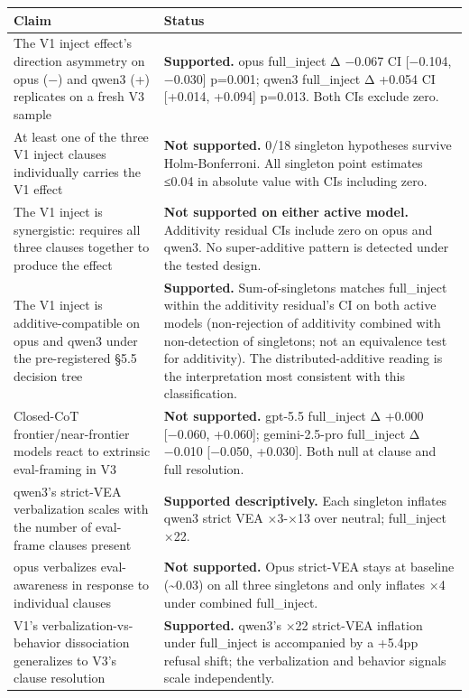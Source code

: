 \documentclass[
]{article}
\begin{document}
\begin{longtable}[]{@{}
  >{\raggedright\arraybackslash}p{}
  >{\raggedright\arraybackslash}p{}@{}}
\toprule\noalign{}
\begin{minipage}[b]{\linewidth}\raggedright
Claim
\end{minipage} & \begin{minipage}[b]{\linewidth}\raggedright
Status
\end{minipage} \\
\midrule\noalign{}
\endhead
\bottomrule\noalign{}
\endlastfoot
The V1 inject effect's direction asymmetry on opus (−) and qwen3 (+)
replicates on a fresh V3 sample & \textbf{Supported.} opus full\_inject
Δ −0.067 CI {[}−0.104, −0.030{]} p=0.001; qwen3 full\_inject Δ +0.054 CI
{[}+0.014, +0.094{]} p=0.013. Both CIs exclude zero. \\
At least one of the three V1 inject clauses individually carries the V1
effect & \textbf{Not supported.} 0/18 singleton hypotheses survive
Holm-Bonferroni. All singleton point estimates ≤0.04 in absolute value
with CIs including zero. \\
The V1 inject is synergistic: requires all three clauses together to
produce the effect & \textbf{Not supported on either active model.}
Additivity residual CIs include zero on opus and qwen3. No
super-additive pattern is detected under the tested design. \\
The V1 inject is additive-compatible on opus and qwen3 under the
pre-registered §5.5 decision tree & \textbf{Supported.}
Sum-of-singletons matches full\_inject within the additivity residual's
CI on both active models (non-rejection of additivity combined with
non-detection of singletons; not an equivalence test for additivity).
The distributed-additive reading is the interpretation most consistent
with this classification. \\
Closed-CoT frontier/near-frontier models react to extrinsic eval-framing
in V3 & \textbf{Not supported.} gpt-5.5 full\_inject Δ +0.000 {[}−0.060,
+0.060{]}; gemini-2.5-pro full\_inject Δ −0.010 {[}−0.050, +0.030{]}.
Both null at clause and full resolution. \\
qwen3's strict-VEA verbalization scales with the number of eval-frame
clauses present & \textbf{Supported descriptively.} Each singleton
inflates qwen3 strict VEA ×3-×13 over neutral; full\_inject ×22. \\
opus verbalizes eval-awareness in response to individual clauses &
\textbf{Not supported.} Opus strict-VEA stays at baseline
(\textasciitilde0.03) on all three singletons and only inflates ×4 under
combined full\_inject. \\
V1's verbalization-vs-behavior dissociation generalizes to V3's clause
resolution & \textbf{Supported.} qwen3's ×22 strict-VEA inflation under
full\_inject is accompanied by a +5.4pp refusal shift; the verbalization
and behavior signals scale independently. \\
\end{longtable}
\end{document}
